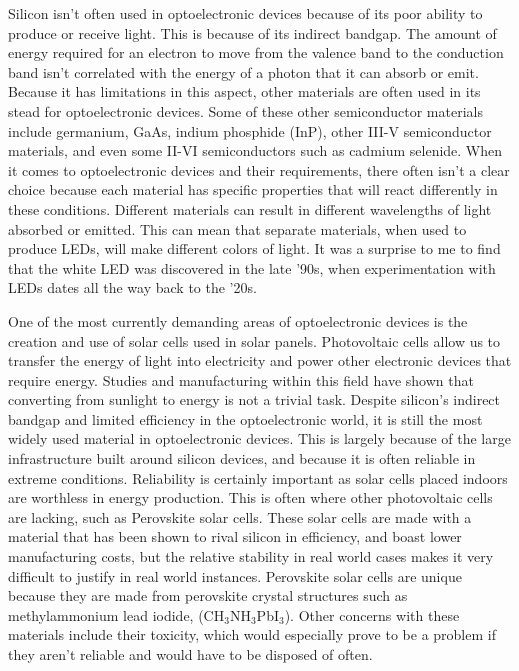 \documentclass[12pt]{article}
\begin{document}
\begin{flushleft}
Silicon isn't often used in optoelectronic devices
because of its poor ability to produce or receive light.
This is because of its indirect bandgap. The amount
of energy required for an electron to move from the
valence band to the conduction band isn't correlated
with the energy of a photon that it can absorb or emit.
Because it has limitations in this aspect, other materials
are often used in its stead for optoelectronic devices.
Some of these other semiconductor materials include
germanium, GaAs, indium phosphide (InP), other III-V
semiconductor materials, and even some II-VI semiconductors
such as cadmium selenide. When it comes to optoelectronic
devices and their requirements, there often isn't a
clear choice because each material has specific properties
that will react differently in these conditions. Different
materials can result in different wavelengths of light
absorbed or emitted. This can mean that separate materials,
when used to produce LEDs, will make different colors
of light. It was a surprise to me to find that the
white LED was discovered in the late '90s, when 
experimentation with LEDs dates all the way back to the
'20s.

One of the most currently demanding areas of optoelectronic
devices is the creation and use of solar cells used
in solar panels. Photovoltaic cells allow us to transfer
the energy of light into electricity and power other
electronic devices that require energy. Studies and
manufacturing within this field have shown that converting
from sunlight to energy is not a trivial task. Despite
silicon's indirect bandgap and limited efficiency in
the optoelectronic world, it is still the most widely
used material in optoelectronic devices. This is largely
because of the large infrastructure built around silicon
devices, and because it is often reliable in extreme
conditions. Reliability is certainly important as solar
cells placed indoors are worthless in energy production.
This is often where other photovoltaic cells are lacking,
such as Perovskite solar cells. These solar cells are
made with a material that has been shown to rival silicon
in efficiency, and boast lower manufacturing costs,
but the relative stability in real world cases makes
it very difficult to justify in real world instances.
Perovskite solar cells are unique because they are
made from perovskite crystal structures such as methylammonium
lead iodide, (CH$_3$NH$_3$PbI$_3$). Other concerns
with these materials include their toxicity, which
would especially prove to be a problem if they aren't
reliable and would have to be disposed of often.


\end{flushleft}
\end{document}
